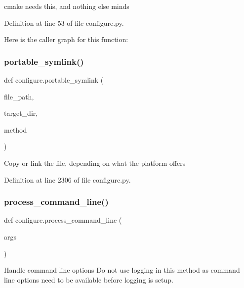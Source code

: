 \begin{DoxyVerb}cmake needs this, and nothing else minds
\end{DoxyVerb}
 

Definition at line 53 of file configure.\+py.

Here is the caller graph for this function\+:
\mbox{\label{namespaceconfigure_a6deca04e253af95f62125b9c30066345}} 
\subsubsection{\texorpdfstring{portable\+\_\+symlink()}{portable\_symlink()}}
{\footnotesize\ttfamily def configure.\+portable\+\_\+symlink (\begin{DoxyParamCaption}\item[{}]{file\+\_\+path,  }\item[{}]{target\+\_\+dir,  }\item[{}]{method }\end{DoxyParamCaption})}

\begin{DoxyVerb}Copy or link the file, depending on what the platform offers
\end{DoxyVerb}
 

Definition at line 2306 of file configure.\+py.

\mbox{\label{namespaceconfigure_a625fe15115495a28f82cad8a1f183d06}} 
\subsubsection{\texorpdfstring{process\+\_\+command\+\_\+line()}{process\_command\_line()}}
{\footnotesize\ttfamily def configure.\+process\+\_\+command\+\_\+line (\begin{DoxyParamCaption}\item[{}]{args }\end{DoxyParamCaption})}

\begin{DoxyVerb}Handle command line options
Do not use logging in this method as command line options need to be
available before logging is setup.
\end{DoxyVerb}
 

